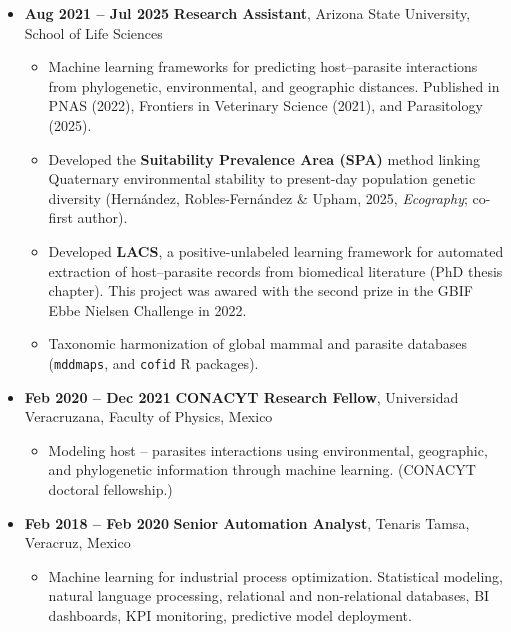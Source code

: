 \documentclass[11pt,a4paper]{article}
\begin{document}
\begin{itemize}[leftmargin=0pt]
\item \textbf{Aug 2021 -- Jul 2025} \quad \textbf{Research Assistant}, Arizona State University, School of Life Sciences
  \begin{itemize}
    \item Machine learning frameworks for predicting host--parasite interactions from phylogenetic, environmental, and geographic distances. Published in PNAS (2022), Frontiers in Veterinary Science (2021), and Parasitology (2025).
    \item Developed the \textbf{Suitability Prevalence Area (SPA)} method linking Quaternary environmental stability to present-day population genetic diversity (Hernández, Robles-Fernández \& Upham, 2025, \textit{Ecography}; co-first author).
    \item Developed \textbf{LACS}, a positive-unlabeled learning framework for automated extraction of host--parasite records from biomedical literature (PhD thesis chapter). This project was awared with the second prize in the GBIF Ebbe Nielsen Challenge in 2022.
    \item Taxonomic harmonization of global mammal and parasite databases (\texttt{mddmaps}, and \texttt{cofid} R packages).
  \end{itemize}

\item \textbf{Feb 2020 -- Dec 2021} \quad \textbf{CONACYT Research Fellow}, Universidad Veracruzana, Faculty of Physics, Mexico
  \begin{itemize}
    \item Modeling host -- parasites interactions using environmental, geographic, and phylogenetic information through machine learning. (CONACYT doctoral fellowship.)
  \end{itemize}
\item \textbf{Feb 2018 -- Feb 2020} \quad  \textbf{Senior Automation Analyst}, Tenaris Tamsa, Veracruz, Mexico
  \begin{itemize}
    \item Machine learning for industrial process optimization. Statistical modeling, natural language processing, relational and non-relational databases, BI dashboards, KPI monitoring, predictive model deployment.
  \end{itemize}
\end{itemize}

\end{document}
